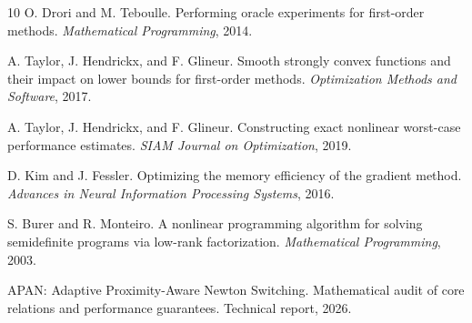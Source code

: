 \documentclass[11pt]{article}
\begin{document}
\begin{thebibliography}{10}
O. Drori and M. Teboulle.
Performing oracle experiments for first-order methods.
\textit{Mathematical Programming}, 2014.

A. Taylor, J. Hendrickx, and F. Glineur.
Smooth strongly convex functions and their impact on lower bounds for first-order methods.
\textit{Optimization Methods and Software}, 2017.

A. Taylor, J. Hendrickx, and F. Glineur.
Constructing exact nonlinear worst-case performance estimates.
\textit{SIAM Journal on Optimization}, 2019.

D. Kim and J. Fessler.
Optimizing the memory efficiency of the gradient method.
\textit{Advances in Neural Information Processing Systems}, 2016.

S. Burer and R. Monteiro.
A nonlinear programming algorithm for solving semidefinite programs via low-rank factorization.
\textit{Mathematical Programming}, 2003.

APAN: Adaptive Proximity-Aware Newton Switching.
Mathematical audit of core relations and performance guarantees.
Technical report, 2026.
\end{thebibliography}
\end{document}
